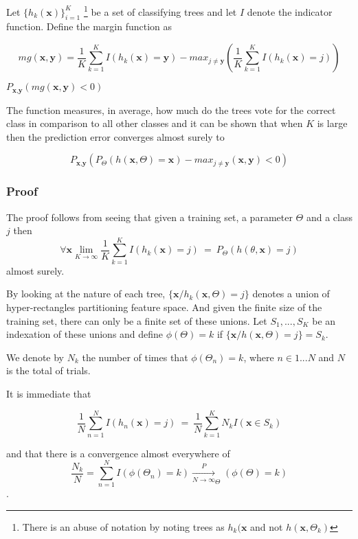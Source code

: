 Let $\{h_k(\textbf{x})\}_{i=1}^K$  \footnote{There is an abuse of notation by noting trees as $h_k(\textbf{x}$ and not $h(\textbf{x}, \Theta_k)$ } be a set of classifying trees and let $I$ denote the indicator function.  Define the margin function as

$$mg(\textbf{x},\textbf{y}) =  \frac{1}{K}   \sum_{k=1}^K I(h_k(\textbf{x}) = \textbf{y})  
- max_{j\neq \textbf{y}}\left(\frac{1}{K} \sum_{k=1}^K I(h_k(\textbf{x}) = j) \right) $$ \label{eq:rf-marginFun}

$ P_{\textbf{x}, \textbf{y} }(mg(\textbf{x}, \textbf{y}) < 0) $


The function measures, in average, how much do the trees vote for the correct class in comparison to all other classes and it can be shown that when $K$ is large then the prediction error converges almost surely to 

$$ P_{\textbf{x}, \textbf{y} } ( P_{\Theta} (h(\textbf{x}, \Theta) = \textbf{x}) - max_{j \neq \textbf{y}} (\textbf{x}, \textbf{y}) < 0) $$

\subsubsection{Proof}
The proof follows from seeing that given a training set, a parameter $\Theta$ and a class $j$ then 
$$\forall \textbf{x} \lim_{K\to\infty} \frac{1}{K} \sum_{k=1}^K I(h_k(\textbf{x}) = j) \ =   \ P_\Theta(h(\theta,\textbf{x}) = j) $$
 almost surely.

By looking at the nature of each tree, $\{\textbf{x} / h_k(\textbf{x}, \Theta) = j \}$ denotes a union of hyper-rectangles partitioning feature space. And given the finite size of the training set, there can only be a finite set of these unions. Let $S_1, ..., S_K$ be an indexation of these unions and define $\phi(\Theta) = k $ if $\{\textbf{x} / h(\textbf{x}, \Theta) = j \} = S_k$. 

We denote by $N_k$ the number of times that $\phi(\Theta_n) =k $, where $n \in {1...N}$ and $N$ is the total of trials.

It is immediate that 

$$ \frac{1}{N} \sum_{n=1}^N I(h_n(\textbf{x}) = j) \ = \  \frac{1}{N} \sum_{k=1}^K N_k I(\textbf{x} \in S_k)  $$

and that there is a convergence almost everywhere of $$ \frac{N_k}{N} = \sum_{n=1}^N  I(\phi(\Theta_n) = k)  \xrightarrow[N \to \infty]   P_{\Theta}(\phi(\Theta)= k)$$. 

